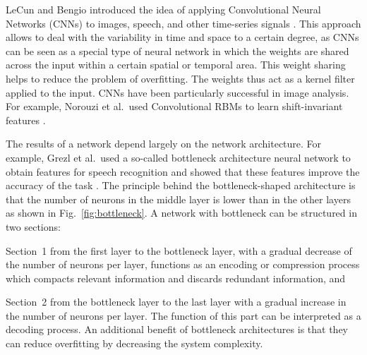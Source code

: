 \documentclass{article}
\begin{document}
LeCun and Bengio introduced the idea of applying Convolutional Neural Networks (CNNs) to images, speech, and other time-series signals \cite{lecun1995convolutional}. This approach allows to deal with the variability in time and space to a certain degree, as CNNs can be seen as a special type of neural network in which the weights are shared across the input within a certain spatial or temporal area. This weight sharing helps to reduce the problem of overfitting. The weights thus act as a kernel filter applied to the input. CNNs have been particularly successful in image analysis. For example, Norouzi et al.\ used Convolutional RBMs to learn shift-invariant features \cite{norouzi2009stacks}. 

The results of a network depend largely on the network architecture. For example, Grezl et al.\ used a so-called bottleneck architecture neural network to obtain features for speech recognition and showed that these features improve the accuracy of the task \cite{grezl2007probabilistic}. The principle behind the bottleneck-shaped architecture is that the number of neurons in the middle layer is lower than in the other layers as shown in Fig.~\ref{fig:bottleneck}. A network with bottleneck can be structured in two sections:  
\begin{inparaenum}[(i)]
    \item   Section~1 from the first layer to the bottleneck layer, with a gradual decrease of the number of neurons per layer, functions as an encoding or compression process which compacts relevant information and discards redundant information, and 
    \item   Section~2 from the bottleneck layer to the last layer with a gradual increase in the number of neurons per layer. The function of this part can be interpreted as a decoding process. An additional benefit of bottleneck architectures is that they can reduce overfitting by decreasing the system complexity.
\end{inparaenum}
\end{document}
